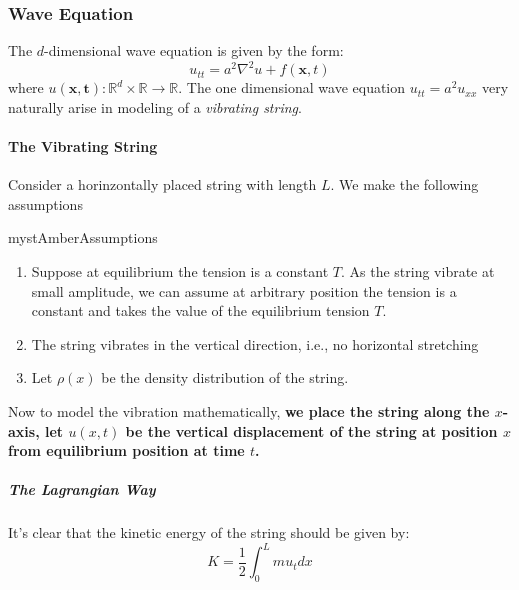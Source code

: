 \subsubsection{Wave Equation}

The $d$-dimensional wave equation is given by the form:
\begin{equation}
u_{tt} = a^2 \nabla^2 u + f(\mathbf{x},t)
\end{equation}
where $u(\mathbf{x,t}): \mathbb{R}^d\times \mathbb{R}\to \mathbb{R}$.\newline
The one dimensional wave equation $u_{tt}=a^2u_{xx}$ very naturally arise in modeling of a \textit{vibrating string}.

\paragraph{The Vibrating String}

Consider a horinzontally placed string with length $L$. We make the following assumptions

\begin{mystadmonition}{mystAmber}{Assumptions}\begin{enumerate}
\item Suppose at equilibrium the tension is a constant $T$. As the string vibrate at small amplitude, we can assume at arbitrary  position the tension is a constant and takes the value of the equilibrium tension $T$.
\item The string vibrates in the vertical direction, i.e., no horizontal stretching
\item Let $\rho(x)$ be the density distribution of the string.
\end{enumerate}

\end{mystadmonition}
Now to model the vibration mathematically, \textbf{we place the string along the $x$-axis, let $u(x,t)$ be the vertical displacement of the string at position $x$ from equilibrium position at time $t$.}

\subparagraph{The Lagrangian Way}

It's clear that the kinetic energy of the string should be given by:
\begin{equation}
K=\frac{1}{2}\int_0^L mu_tdx
\end{equation}